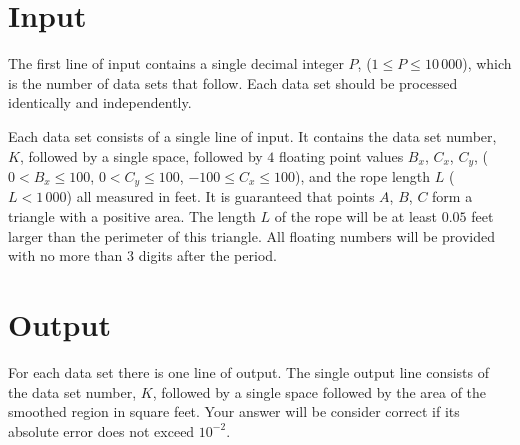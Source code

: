 \section*{Input}

The first line of input contains a single decimal integer $P$, ($1 \le P \le 10\,000$), which is the number of
data sets that follow. Each data set should be processed identically and independently.

Each data set consists of a single line of input. It contains the data set number, $K$, followed by a
single space, followed by $4$ floating point values $B_x$, $C_x$, $C_y$, 
($0 < B_x \le 100$, $0 < C_y \le 100$, $-100 \le C_x \le 100$), 
and the rope length $L$ ($L < 1\,000$) all measured in feet.  It is guaranteed that points $A$, $B$, $C$
form a triangle with a positive area.  The length $L$ of the rope will be at least
$0.05$ feet larger than the perimeter of this triangle.  
All floating numbers will be provided with no more than $3$ digits after the period.

\section*{Output}

For each data set there is one line of output. The single output line consists of the data set number,
$K$, followed by a single space followed by the area of the smoothed region in square feet.
Your answer will be consider correct if its absolute error does not exceed $10^{-2}$.

